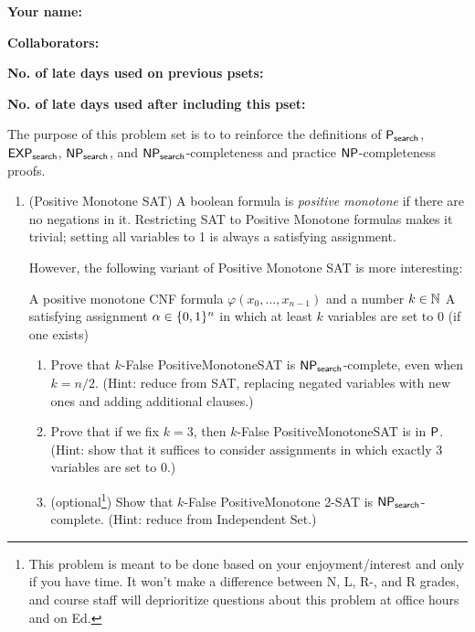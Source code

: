 \documentclass[11pt]{article}
\begin{document}


\textbf{Your name: }

\textbf{Collaborators: }

\textbf{No. of late days used on previous psets: }

\textbf{No. of late days used after including this pset: }

\vspace{1em}

\noindent The purpose of this problem set is to to reinforce the definitions of $\mathsf{P_{search}}$, $\mathsf{EXP_{search}}$, $\mathsf{NP_{search}}$, and $\mathsf{NP_{search}}$-completeness and practice $\mathsf{NP}$-completeness proofs. 

\begin{enumerate}
    \item (Positive Monotone SAT)
    A boolean formula is {\em positive monotone} if there are no negations in it.  Restricting SAT to Positive Monotone formulas makes it trivial; setting all variables to 1 is always a satisfying assignment.
    
    However, the following variant of Positive Monotone SAT is more interesting:
    
        {A positive monotone CNF formula $\varphi(x_0,\ldots,x_{n-1})$ and a number $k\in \mathbb{N}$}
        {A satisfying assignment $\alpha\in\{0,1\}^n$ in which at least $k$ variables are set to 0 (if one exists)}
    
    \begin{enumerate}
        \item Prove that $k$-False PositiveMonotoneSAT is $\mathsf{NP_{search}}$-complete, even when $k=n/2$.  (Hint: reduce from SAT, replacing negated variables with new ones and adding additional clauses.)
        \item Prove that if we fix $k=3$, then $k$-False PositiveMonotoneSAT is in $\mathsf{P}$. (Hint: show that it suffices to consider assignments in which exactly 3 variables are set to 0.)
        \item (optional\footnote{This problem is meant to be done based on your enjoyment/interest and only if you have time. It won't make a difference between N, L, R-, and R grades, and course staff will deprioritize questions about this problem at office hours and on Ed.}) Show that $k$-False PositiveMonotone 2-SAT is $\mathsf{NP_{search}}$-complete.  (Hint: reduce from Independent Set.)
    \end{enumerate}



\end{enumerate}
\end{document}
